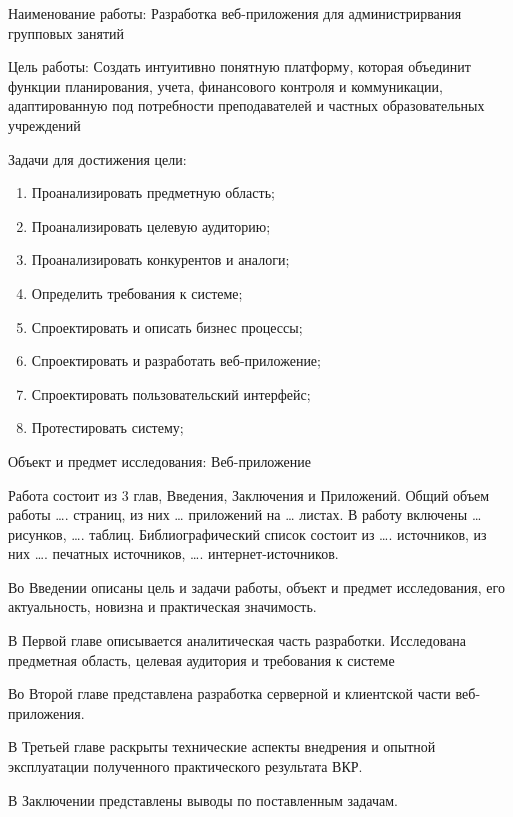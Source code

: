 Наименование работы: Разработка веб-приложения для администрирвания групповых занятий

Цель работы: Создать интуитивно понятную платформу, которая объединит функции планирования, учета,
финансового контроля и коммуникации, адаптированную под потребности
преподавателей и частных образовательных учреждений

Задачи для достижения цели:

\begin{enumerate}
    \item Проанализировать предметную область;
    \item Проанализировать целевую аудиторию;
    \item Проанализировать конкурентов и аналоги;
    \item Определить требования к системе;
    \item Спроектировать и описать бизнес процессы;
    \item Спроектировать и разработать веб-приложение;
    \item Спроектировать пользовательский интерфейс;
    \item Протестировать систему;
\end{enumerate}
Объект и предмет исследования: Веб-приложение

Работа состоит из 3 глав, Введения, Заключения и Приложений. Общий объем работы …. страниц, из них … приложений на … листах. В работу включены … рисунков, …. таблиц. Библиографический список состоит из …. источников, из них …. печатных источников, …. интернет-источников.

Во Введении описаны цель и задачи работы, объект и предмет исследования, его актуальность, новизна и практическая значимость.

В Первой главе описывается аналитическая часть разработки. Исследована предметная область, целевая аудитория и требования к системе

Во Второй главе представлена разработка серверной и клиентской части веб-приложения.

В Третьей главе раскрыты технические аспекты внедрения и опытной эксплуатации полученного практического результата ВКР.

В Заключении представлены выводы по поставленным задачам.